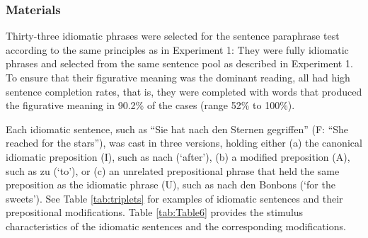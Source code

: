 \documentclass[output=paper]{langsci/langscibook}
\begin{document}
\subsubsection{Materials}
Thirty-three idiomatic phrases were selected for the sentence paraphrase test according to the same principles as in Experiment 1: They were fully idiomatic phrases and selected from the same sentence pool as described in Experiment 1.  To ensure that their figurative meaning was the dominant reading, all had high sentence completion rates, that is, they were completed with words that produced the figurative meaning in 90.2\% of the cases (range 52\% to 100\%).

Each idiomatic sentence, such as “Sie hat nach den Sternen gegriffen” (F: “She reached for the stars”), was cast in three versions, holding either (a) the canonical idiomatic preposition (I), such as nach (‘after’), (b) a modified preposition (A), such as zu (‘to’), or (c) an unrelated prepositional phrase that held the same preposition as the idiomatic phrase (U), such as nach den Bonbons (‘for the sweets’). See Table \ref{tab:triplets} for examples of idiomatic sentences and their prepositional modifications. Table \ref{tab:Table6} provides the stimulus characteristics of the idiomatic sentences and the corresponding modifications.
\end{document}
